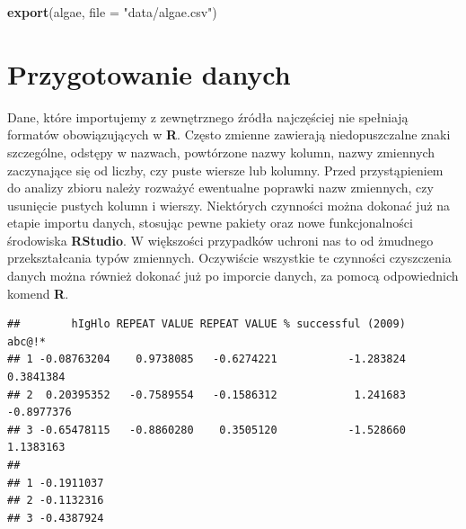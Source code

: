 \documentclass[
]{book}
\newenvironment{Shaded}{\begin{snugshade}}{\end{snugshade}}
\newcommand{\CommentTok}[1]{\textcolor[rgb]{0.56,0.35,0.01}{\textit{#1}}}
\newcommand{\DataTypeTok}[1]{\textcolor[rgb]{0.13,0.29,0.53}{#1}}
\newcommand{\DecValTok}[1]{\textcolor[rgb]{0.00,0.00,0.81}{#1}}
\newcommand{\KeywordTok}[1]{\textcolor[rgb]{0.13,0.29,0.53}{\textbf{#1}}}
\newcommand{\NormalTok}[1]{#1}
\newcommand{\StringTok}[1]{\textcolor[rgb]{0.31,0.60,0.02}{#1}}
\theoremstyle{plain}
\theoremstyle{definition}
\theoremstyle{definition}
\theoremstyle{definition}
\theoremstyle{definition}
\theoremstyle{remark}
\begin{document}
\begin{Shaded}
\begin{Highlighting}[]
\KeywordTok{export}\NormalTok{(algae, }\DataTypeTok{file =} \StringTok{"data/algae.csv"}\NormalTok{)}
\end{Highlighting}
\end{Shaded}

\hypertarget{przygotowanie-danych}{%
\chapter{Przygotowanie danych}\label{przygotowanie-danych}}

Dane, które importujemy z zewnętrznego źródła najczęściej nie spełniają formatów obowiązujących w \textbf{R}. Często zmienne zawierają niedopuszczalne znaki szczególne, odstępy w nazwach, powtórzone nazwy kolumn, nazwy zmiennych zaczynające się od liczby, czy puste wiersze lub kolumny. Przed przystąpieniem do analizy zbioru należy rozważyć ewentualne poprawki nazw zmiennych, czy usunięcie pustych kolumn i wierszy. Niektórych czynności można dokonać już na etapie importu danych, stosując pewne pakiety oraz nowe funkcjonalności środowiska \textbf{RStudio}. W większości przypadków uchroni nas to od żmudnego przekształcania typów zmiennych. Oczywiście wszystkie te czynności czyszczenia danych można również dokonać już po imporcie danych, za pomocą odpowiednich komend \textbf{R}.

\begin{Shaded}
\end{Shaded}

\begin{verbatim}
##        hIgHlo REPEAT VALUE REPEAT VALUE % successful (2009)     abc@!*
## 1 -0.08763204    0.9738085   -0.6274221           -1.283824  0.3841384
## 2  0.20395352   -0.7589554   -0.1586312            1.241683 -0.8977376
## 3 -0.65478115   -0.8860280    0.3505120           -1.528660  1.1383163
##             
## 1 -0.1911037
## 2 -0.1132316
## 3 -0.4387924
\end{verbatim}
\end{document}
